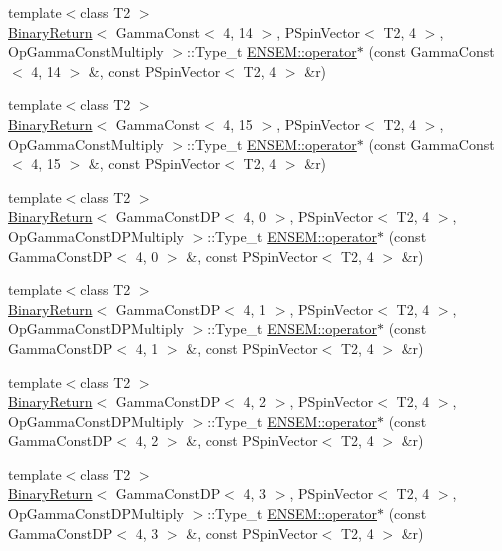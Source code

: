 \begin{DoxyCompactItemize}
\item 
{\footnotesize template$<$class T2 $>$ }\\\mbox{\hyperlink{structBinaryReturn}{Binary\+Return}}$<$ Gamma\+Const$<$ 4, 14 $>$, P\+Spin\+Vector$<$ T2, 4 $>$, Op\+Gamma\+Const\+Multiply $>$\+::Type\+\_\+t \mbox{\hyperlink{group__primspinvector_ga890c8e465f4d1855cc9aa62f066b5679}{E\+N\+S\+E\+M\+::operator$\ast$}} (const Gamma\+Const$<$ 4, 14 $>$ \&, const P\+Spin\+Vector$<$ T2, 4 $>$ \&r)
\item 
{\footnotesize template$<$class T2 $>$ }\\\mbox{\hyperlink{structBinaryReturn}{Binary\+Return}}$<$ Gamma\+Const$<$ 4, 15 $>$, P\+Spin\+Vector$<$ T2, 4 $>$, Op\+Gamma\+Const\+Multiply $>$\+::Type\+\_\+t \mbox{\hyperlink{group__primspinvector_ga66707f89120c5b6f17816a485d9900eb}{E\+N\+S\+E\+M\+::operator$\ast$}} (const Gamma\+Const$<$ 4, 15 $>$ \&, const P\+Spin\+Vector$<$ T2, 4 $>$ \&r)
\item 
{\footnotesize template$<$class T2 $>$ }\\\mbox{\hyperlink{structBinaryReturn}{Binary\+Return}}$<$ Gamma\+Const\+DP$<$ 4, 0 $>$, P\+Spin\+Vector$<$ T2, 4 $>$, Op\+Gamma\+Const\+D\+P\+Multiply $>$\+::Type\+\_\+t \mbox{\hyperlink{group__primspinvector_ga90d081a5379c410e3a2225ba98128415}{E\+N\+S\+E\+M\+::operator$\ast$}} (const Gamma\+Const\+DP$<$ 4, 0 $>$ \&, const P\+Spin\+Vector$<$ T2, 4 $>$ \&r)
\item 
{\footnotesize template$<$class T2 $>$ }\\\mbox{\hyperlink{structBinaryReturn}{Binary\+Return}}$<$ Gamma\+Const\+DP$<$ 4, 1 $>$, P\+Spin\+Vector$<$ T2, 4 $>$, Op\+Gamma\+Const\+D\+P\+Multiply $>$\+::Type\+\_\+t \mbox{\hyperlink{group__primspinvector_gaed649bcddaa4c48fdd28113f712d2ab7}{E\+N\+S\+E\+M\+::operator$\ast$}} (const Gamma\+Const\+DP$<$ 4, 1 $>$ \&, const P\+Spin\+Vector$<$ T2, 4 $>$ \&r)
\item 
{\footnotesize template$<$class T2 $>$ }\\\mbox{\hyperlink{structBinaryReturn}{Binary\+Return}}$<$ Gamma\+Const\+DP$<$ 4, 2 $>$, P\+Spin\+Vector$<$ T2, 4 $>$, Op\+Gamma\+Const\+D\+P\+Multiply $>$\+::Type\+\_\+t \mbox{\hyperlink{group__primspinvector_gad71a48b8030b0f439b6c45ff4c5d550b}{E\+N\+S\+E\+M\+::operator$\ast$}} (const Gamma\+Const\+DP$<$ 4, 2 $>$ \&, const P\+Spin\+Vector$<$ T2, 4 $>$ \&r)
\item 
{\footnotesize template$<$class T2 $>$ }\\\mbox{\hyperlink{structBinaryReturn}{Binary\+Return}}$<$ Gamma\+Const\+DP$<$ 4, 3 $>$, P\+Spin\+Vector$<$ T2, 4 $>$, Op\+Gamma\+Const\+D\+P\+Multiply $>$\+::Type\+\_\+t \mbox{\hyperlink{group__primspinvector_ga62ad9e5b7456ea7e7aeb04de82e03545}{E\+N\+S\+E\+M\+::operator$\ast$}} (const Gamma\+Const\+DP$<$ 4, 3 $>$ \&, const P\+Spin\+Vector$<$ T2, 4 $>$ \&r)

\end{DoxyCompactItemize}
